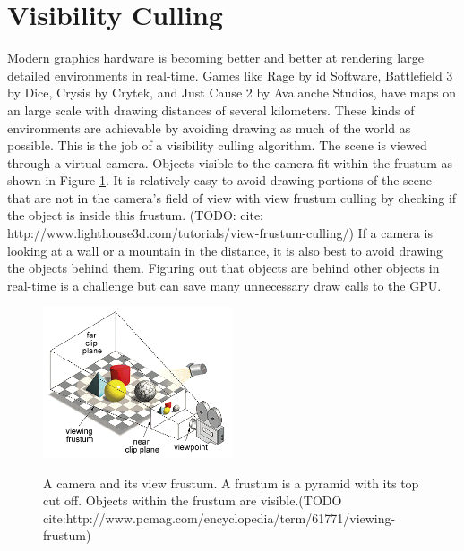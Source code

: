 \documentclass[12pt]{ucthesis}
\newcommand{\captionfonts}{\small\bf\ssp}
\begin{document}
\section{Visibility Culling}
\label{visibility-culling}

Modern graphics hardware is becoming better and better at rendering large detailed environments in real-time.
Games like Rage by id Software, Battlefield 3 by Dice, Crysis by Crytek, and Just Cause 2 by Avalanche Studios, have maps on an large scale with drawing distances of several kilometers.
These kinds of environments are achievable by avoiding drawing as much of the world as possible.\cite{heir-occ-map, large-occluders, Vis-Computations-Densely-Occluded, Portal-culling, Cryengine-culling-explained, Portals-mirrors, dpvs, cryengine3, culling-bf, CHC, CHCpp}
This is the job of a visibility culling algorithm.
The scene is viewed through a virtual camera.
Objects visible to the camera fit within the frustum as shown in Figure \ref{fig:frustum}.
It is relatively easy to avoid drawing portions of the scene that are not in the camera's field of view with view frustum culling by checking if the object is inside this frustum.
(TODO: cite: http://www.lighthouse3d.com/tutorials/view-frustum-culling/)
If a camera is looking at a wall or a mountain in the distance, it is also best to avoid drawing the objects behind them.
Figuring out that objects are behind other objects in real-time is a challenge but can save many unnecessary draw calls to the GPU.

\begin{figure}
\begin{center}
\includegraphics[width=0.5\textwidth]{Images/frustum.png}
\captionfonts
\caption[View Frustum]{A camera and its view frustum. A frustum is a pyramid with its top cut off. Objects within the frustum are visible.(TODO cite:http://www.pcmag.com/encyclopedia/term/61771/viewing-frustum)}
\label{fig:frustum}
\end{center}
\end{figure}
\end{document}
